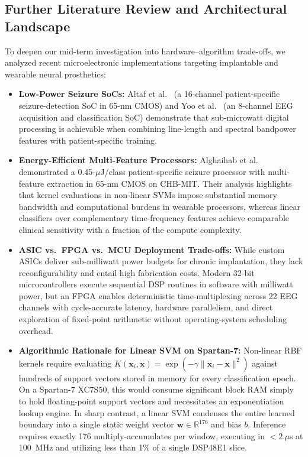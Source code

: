 \documentclass[10pt,twocolumn,letterpaper]{article}
\begin{document}
{\color{blue}
\subsection{Further Literature Review and Architectural Landscape}
\label{sec:lit_further}

To deepen our mid-term investigation into hardware--algorithm trade-offs, we analyzed recent microelectronic implementations targeting implantable and wearable neural prosthetics:
\begin{itemize}
    \item \textbf{Low-Power Seizure SoCs:} Altaf et al.\ \cite{altaf2015biomedical} (a 16-channel patient-specific seizure-detection SoC in 65-nm CMOS) and Yoo et al.\ \cite{yoo2013eight} (an 8-channel EEG acquisition and classification SoC) demonstrate that sub-microwatt digital processing is achievable when combining line-length and spectral bandpower features with patient-specific training.
    \item \textbf{Energy-Efficient Multi-Feature Processors:} Alghaihab et al.\ \cite{alghaihab2022energy} demonstrated a 0.45-$\mu$J/class patient-specific seizure processor with multi-feature extraction in 65-nm CMOS on CHB-MIT. Their analysis highlights that kernel evaluations in non-linear SVMs impose substantial memory bandwidth and computational burdens in wearable processors, whereas linear classifiers over complementary time-frequency features achieve comparable clinical sensitivity with a fraction of the compute complexity.
    \item \textbf{ASIC vs.\ FPGA vs.\ MCU Deployment Trade-offs:} While custom ASICs deliver sub-milliwatt power budgets for chronic implantation, they lack reconfigurability and entail high fabrication costs. Modern 32-bit microcontrollers execute sequential DSP routines in software with milliwatt power, but an FPGA enables deterministic time-multiplexing across 22 EEG channels with cycle-accurate latency, hardware parallelism, and direct exploration of fixed-point arithmetic without operating-system scheduling overhead.
    \item \textbf{Algorithmic Rationale for Linear SVM on Spartan-7:} Non-linear RBF kernels require evaluating $K(\mathbf{x}_i, \mathbf{x}) = \exp(-\gamma \|\mathbf{x}_i - \mathbf{x}\|^2)$ against hundreds of support vectors stored in memory for every classification epoch. On a Spartan-7 XC7S50, this would consume significant block RAM simply to hold floating-point support vectors and necessitates an exponentiation lookup engine. In sharp contrast, a linear SVM condenses the entire learned boundary into a single static weight vector $\mathbf{w} \in \mathbb{R}^{176}$ and bias $b$. Inference requires exactly 176 multiply-accumulates per window, executing in $<2~\mu$s at 100~MHz and utilizing less than 1\% of a single DSP48E1 slice.
\end{itemize}
}
\end{document}
